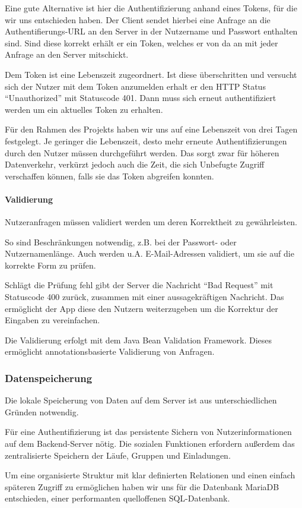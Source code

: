 Eine gute Alternative ist hier die Authentifizierung anhand eines Tokens, für die wir uns entschieden haben. Der Client sendet hierbei eine Anfrage an die Authentifierungs-URL an den Server in der Nutzername und Passwort enthalten sind. Sind diese korrekt erhält er ein Token, welches er von da an mit jeder Anfrage an den Server mitschickt.

Dem Token ist eine Lebenszeit zugeordnert. Ist diese überschritten und versucht sich der Nutzer mit dem Token anzumelden erhalt er den HTTP Status ``Unauthorized'' mit Statuscode 401. Dann muss sich erneut authentifiziert werden um ein aktuelles Token zu erhalten.

Für den Rahmen des Projekts haben wir uns auf eine Lebenszeit von drei Tagen festgelegt. Je geringer die Lebenszeit, desto mehr erneute Authentifizierungen durch den Nutzer müssen durchgeführt werden. Das sorgt zwar für höheren Datenverkehr, verkürzt jedoch auch die Zeit, die sich Unbefugte Zugriff verschaffen können, falls sie das Token abgreifen konnten. 
\paragraph{Validierung}
Nutzeranfragen müssen validiert werden um deren Korrektheit zu gewährleisten.

So sind Beschränkungen notwendig, z.B. bei der Passwort- oder Nutzernamenlänge. Auch werden u.A. E-Mail-Adressen validiert, um sie auf die korrekte Form zu prüfen.

Schlägt die Prüfung fehl gibt der Server die Nachricht ``Bad Request'' mit Statuscode 400 zurück, zusammen mit einer aussagekräftigen Nachricht. Das ermöglicht der App diese den Nutzern weiterzugeben um die Korrektur der Eingaben zu vereinfachen.

Die Validierung erfolgt mit dem Java Bean Validation Framework. Dieses ermöglicht annotationsbasierte Validierung von Anfragen.
\subsubsection{Datenspeicherung}
Die lokale Speicherung von Daten auf dem Server ist aus unterschiedlichen Gründen notwendig.

Für eine Authentifizierung ist das persistente Sichern von Nutzerinformationen auf dem Backend-Server nötig. Die sozialen Funktionen erfordern außerdem das zentralisierte Speichern der Läufe, Gruppen und Einladungen.

Um eine organisierte Struktur mit klar definierten Relationen und einen einfach späteren Zugriff zu ermöglichen haben wir uns für die Datenbank MariaDB entschieden, einer performanten quelloffenen SQL-Datenbank.
